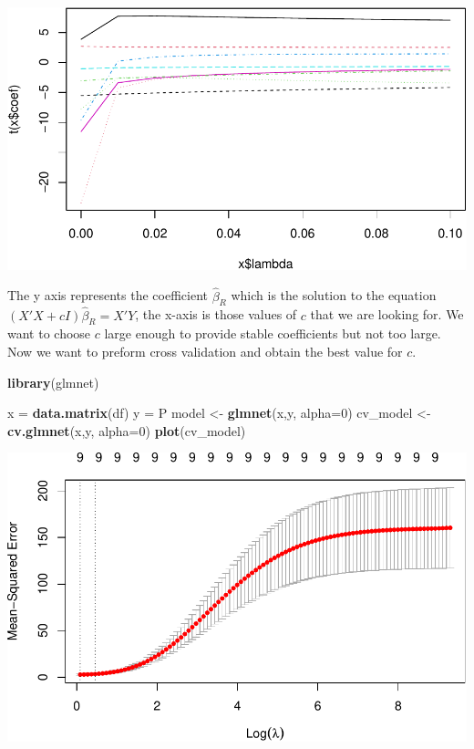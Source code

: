 \documentclass[
  11pt,
]{article}
\newenvironment{Shaded}{\begin{snugshade}}{\end{snugshade}}
\newcommand{\AttributeTok}[1]{\textcolor[rgb]{0.13,0.29,0.53}{#1}}
\newcommand{\DecValTok}[1]{\textcolor[rgb]{0.00,0.00,0.81}{#1}}
\newcommand{\FunctionTok}[1]{\textcolor[rgb]{0.13,0.29,0.53}{\textbf{#1}}}
\newcommand{\NormalTok}[1]{#1}
\newcommand{\OtherTok}[1]{\textcolor[rgb]{0.56,0.35,0.01}{#1}}
\begin{document}
\includegraphics{examples_files/figure-latex/unnamed-chunk-55-1.pdf}

The y axis represents the coefficient \(\hat{\beta}_R\) which is the
solution to the equation \((X'X + cI)\hat{\beta}_R = X'Y\), the x-axis
is those values of \(c\) that we are looking for. We want to choose
\(c\) large enough to provide stable coefficients but not too large. Now
we want to preform cross validation and obtain the best value for \(c\).

\begin{Shaded}
\begin{Highlighting}[]
\FunctionTok{library}\NormalTok{(glmnet)}

\NormalTok{x }\OtherTok{=} \FunctionTok{data.matrix}\NormalTok{(df)}
\NormalTok{y }\OtherTok{=}\NormalTok{ P}
\NormalTok{model }\OtherTok{\textless{}{-}} \FunctionTok{glmnet}\NormalTok{(x,y, }\AttributeTok{alpha=}\DecValTok{0}\NormalTok{)}
\NormalTok{cv\_model }\OtherTok{\textless{}{-}} \FunctionTok{cv.glmnet}\NormalTok{(x,y, }\AttributeTok{alpha=}\DecValTok{0}\NormalTok{)}
\FunctionTok{plot}\NormalTok{(cv\_model)}
\end{Highlighting}
\end{Shaded}

\includegraphics{examples_files/figure-latex/unnamed-chunk-56-1.pdf}
\end{document}
